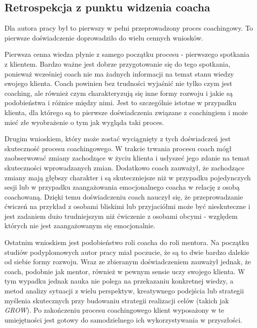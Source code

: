 \subsection{Retrospekcja z punktu widzenia coacha}

Dla autora pracy był to pierwszy w pełni przeprowadzony proces coachingowy. To pierwsze doświadczenie doprowadziło do wielu cennych wniosków.

Pierwsza cenna wiedza płynie z samego początku procesu - pierwszego spotkania z klientem. Bardzo ważne jest dobrze przygotowanie się do tego spotkania,
ponieważ wcześniej coach nie ma żadnych informacji na temat stanu wiedzy swojego klienta. Coach powinien bez trudności wyjaśnić nie tylko czym jest coaching,
ale również czym charakteryzują się inne formy rozwoju i jakie są podobieństwa i różnice między nimi. Jest to szczególnie istotne w przypadku
klienta, dla którego są to pierwsze doświadczenia związane z coachingiem i może mieć złe wyobrażenie o tym jak wygląda taki proces.

Drugim wnioskiem, który może zostać wyciągnięty z tych doświadczeń jest skuteczność procesu coachingowego. W trakcie trwania procesu coach mógł zaobserwować
zmiany zachodzące w życiu klienta i usłyszeć jego zdanie na temat skuteczności wprowadzanych zmian. Dodatkowo coach zauważył, że zachodzące zmiany
mają głębszy charakter i są skuteczniejsze niż w przypadku pojedynczych sesji lub w przypadku zaangażowania emocjonalnego coacha w relację z osobą
coachowaną. Dzięki temu doświadczeniu coach nauczył się, że przeprowadzanie ćwiczeń na przykład z osobami bliskimi lub przyjaciółmi może być nieskuteczne
i jest zadaniem dużo trudniejszym niż ćwiczenie z osobami obcymi - względem których nie jest zaangażowanym się emocjonalnie.

Ostatnim wnioskiem jest podobieństwo roli coacha do roli mentora. Na początku studiów podyplomowych autor pracy miał poczucie, że są to dwie bardzo
dalekie od siebie formy rozwoju. Wraz ze zbieranym doświadczeniem zauważył jednak, że coach, podobnie jak mentor, również w pewnym sensie uczy swojego klienta.
W tym wypadku jednak nauka nie polega na przekazaniu konkretnej wiedzy, a metod analizy sytuacji z wielu perspektyw, kreatywnego podejścia lub
strategii myślenia skutecznych przy budowaniu strategii realizacji celów (takich jak \emph{GROW}). Po zakończeniu procesu coachingowego klient wyposażony
w te umiejętności jest gotowy do samodzielnego ich wykorzystywania w przyszłości.
